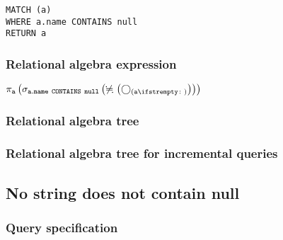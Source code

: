 \begin{lstlisting}
MATCH (a)
WHERE a.name CONTAINS null
RETURN a
\end{lstlisting}

\subsubsection*{Relational algebra expression}

$\projection{\var{a}} \left(\selection{\mathtt{a.name~CONTAINS~null}} \left(\alldifferent{} \left(\getvertices{a}{}\right)\right)\right)$

\subsubsection*{Relational algebra tree}


\subsubsection*{Relational algebra tree for incremental queries}


\subsection{No string does not contain null}

\subsubsection*{Query specification}


